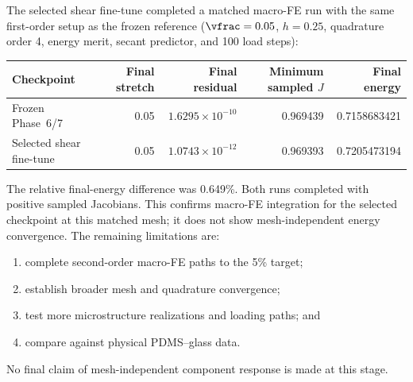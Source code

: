 The selected shear fine-tune completed a matched macro-FE run with the same
first-order setup as the frozen reference (\(\vfrac=0.05\), \(h=0.25\),
quadrature order 4, energy merit, secant predictor, and 100 load steps):
\begin{center}
\begin{tabular}{@{}lrrrr@{}}
\toprule
Checkpoint & Final stretch & Final residual & Minimum sampled \(J\) & Final energy\\
\midrule
Frozen Phase~6/7 & 0.05 & \(1.6295\times10^{-10}\) & 0.969439 & 0.7158683421\\
Selected shear fine-tune & 0.05 & \(1.0743\times10^{-12}\) & 0.969393 & 0.7205473194\\
\bottomrule
\end{tabular}
\end{center}
The relative final-energy difference was 0.649\%. Both runs completed with
positive sampled Jacobians. This confirms macro-FE integration for the
selected checkpoint at this matched mesh; it does not show mesh-independent
energy convergence. The remaining limitations are:
\begin{enumerate}
  \item complete second-order macro-FE paths to the 5\% target;
  \item establish broader mesh and quadrature convergence;
  \item test more microstructure realizations and loading paths; and
  \item compare against physical PDMS--glass data.
\end{enumerate}
No final claim of mesh-independent component response is made at this stage.
